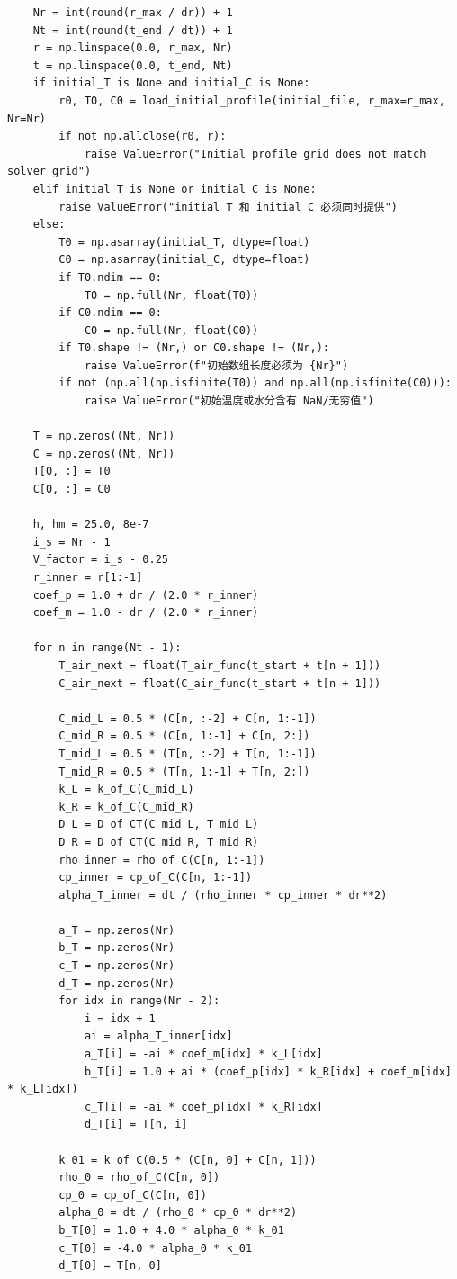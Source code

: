 \documentclass[withoutpreface,bwprint]{cumcm_thesis}
\begin{document}
\begin{appendices}
\begin{lstlisting}
    Nr = int(round(r_max / dr)) + 1
    Nt = int(round(t_end / dt)) + 1
    r = np.linspace(0.0, r_max, Nr)
    t = np.linspace(0.0, t_end, Nt)
    if initial_T is None and initial_C is None:
        r0, T0, C0 = load_initial_profile(initial_file, r_max=r_max, Nr=Nr)
        if not np.allclose(r0, r):
            raise ValueError("Initial profile grid does not match solver grid")
    elif initial_T is None or initial_C is None:
        raise ValueError("initial_T 和 initial_C 必须同时提供")
    else:
        T0 = np.asarray(initial_T, dtype=float)
        C0 = np.asarray(initial_C, dtype=float)
        if T0.ndim == 0:
            T0 = np.full(Nr, float(T0))
        if C0.ndim == 0:
            C0 = np.full(Nr, float(C0))
        if T0.shape != (Nr,) or C0.shape != (Nr,):
            raise ValueError(f"初始数组长度必须为 {Nr}")
        if not (np.all(np.isfinite(T0)) and np.all(np.isfinite(C0))):
            raise ValueError("初始温度或水分含有 NaN/无穷值")

    T = np.zeros((Nt, Nr))
    C = np.zeros((Nt, Nr))
    T[0, :] = T0
    C[0, :] = C0

    h, hm = 25.0, 8e-7
    i_s = Nr - 1
    V_factor = i_s - 0.25
    r_inner = r[1:-1]
    coef_p = 1.0 + dr / (2.0 * r_inner)
    coef_m = 1.0 - dr / (2.0 * r_inner)

    for n in range(Nt - 1):
        T_air_next = float(T_air_func(t_start + t[n + 1]))
        C_air_next = float(C_air_func(t_start + t[n + 1]))

        C_mid_L = 0.5 * (C[n, :-2] + C[n, 1:-1])
        C_mid_R = 0.5 * (C[n, 1:-1] + C[n, 2:])
        T_mid_L = 0.5 * (T[n, :-2] + T[n, 1:-1])
        T_mid_R = 0.5 * (T[n, 1:-1] + T[n, 2:])
        k_L = k_of_C(C_mid_L)
        k_R = k_of_C(C_mid_R)
        D_L = D_of_CT(C_mid_L, T_mid_L)
        D_R = D_of_CT(C_mid_R, T_mid_R)
        rho_inner = rho_of_C(C[n, 1:-1])
        cp_inner = cp_of_C(C[n, 1:-1])
        alpha_T_inner = dt / (rho_inner * cp_inner * dr**2)

        a_T = np.zeros(Nr)
        b_T = np.zeros(Nr)
        c_T = np.zeros(Nr)
        d_T = np.zeros(Nr)
        for idx in range(Nr - 2):
            i = idx + 1
            ai = alpha_T_inner[idx]
            a_T[i] = -ai * coef_m[idx] * k_L[idx]
            b_T[i] = 1.0 + ai * (coef_p[idx] * k_R[idx] + coef_m[idx] * k_L[idx])
            c_T[i] = -ai * coef_p[idx] * k_R[idx]
            d_T[i] = T[n, i]

        k_01 = k_of_C(0.5 * (C[n, 0] + C[n, 1]))
        rho_0 = rho_of_C(C[n, 0])
        cp_0 = cp_of_C(C[n, 0])
        alpha_0 = dt / (rho_0 * cp_0 * dr**2)
        b_T[0] = 1.0 + 4.0 * alpha_0 * k_01
        c_T[0] = -4.0 * alpha_0 * k_01
        d_T[0] = T[n, 0]


\end{lstlisting}
\end{appendices}
\end{document}
